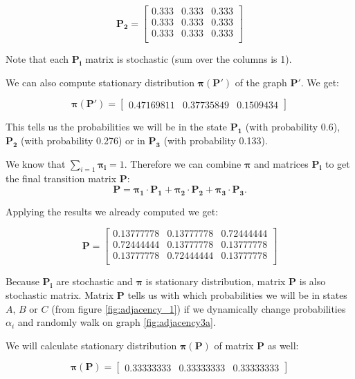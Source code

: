 \documentclass{article}
\begin{document}
\[\mathbf{P_2}=
\begin{bmatrix}
    0.333 &  0.333 &  0.333 \\
    0.333 & 0.333 &  0.333  \\
    0.333 & 0.333 & 0.333 \\
\end{bmatrix}
\]

 Note that each $\mathbf{P_i}$ matrix is stochastic (sum over the columns is 1).


We can also compute stationary distribution $\mathbf{\pi(P')}$  of the graph $\mathbf{P'}$. We get: 

\begin{equation}
	\mathbf{\pi(P')} = \begin{bmatrix}
	0.47169811 & 0.37735849 & 0.1509434
	\end{bmatrix}
	\label{eq:st_distr_P'_1}
\end{equation}

This tells us the probabilities we will be in the state $\mathbf{P_1}$ (with probability 0.6), $\mathbf{P_2}$  (with probability 0.276) or in $\mathbf{P_3}$ (with probability 0.133). 

We know that $\sum_{i=1}\mathbf{\pi_i} = 1$. Therefore we can combine $\mathbf{\pi}$ and matrices $\mathbf{P_i}$ to get the final transition matrix $\mathbf{P}$:
$$ \mathbf{P} = \mathbf{\pi_1} \cdot \mathbf{P_1} + \mathbf{\pi_2} \cdot \mathbf{P_2} + \mathbf{\pi_3} \cdot \mathbf{P_3}.$$

Applying the results we already computed we get:

\[\mathbf{P}=
\begin{bmatrix}
    0.13777778 &  0.13777778 &  0.72444444 \\
    0.72444444 & 0.13777778 &  0.13777778  \\
    0.13777778 & 0.72444444 & 0.13777778 \\
\end{bmatrix}
\]

Because $\mathbf{P_i}$ are stochastic and $\mathbf{\pi}$ is stationary distribution, matrix $\mathbf{P}$ is also stochastic matrix. Matrix $\mathbf{P}$ tells us with which probabilities we will be in states $A$, $B$ or $C$ (from figure \ref{fig:adjacency_1}) if we dynamically change probabilities $\alpha_i$ and randomly walk on graph \ref{fig:adjacency3a}. 

We will calculate stationary distribution $\mathbf{\pi(P)}$ of matrix $\mathbf{P}$ as well:

\begin{equation}
	\mathbf{\pi(P)} = \begin{bmatrix}
	0.33333333 & 0.33333333 & 0.33333333
	\end{bmatrix}
	\label{eq:st_distr_P_1}
\end{equation}
\end{document}
